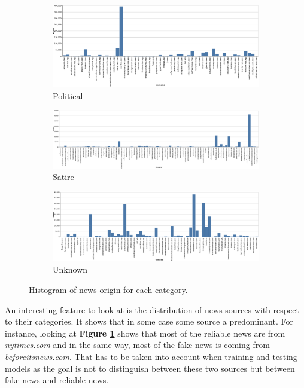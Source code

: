 \begin{figure}\ContinuedFloat
    \begin{subfigure}[b]{1\textwidth}
         \centering
         \includegraphics[width=\textwidth]{images/data_exploration/political.eps}
         \caption{Political}
     \end{subfigure}
     \vfill
     \begin{subfigure}[b]{1\textwidth}
         \centering
         \includegraphics[width=\textwidth]{images/data_exploration/satire.eps}
         \caption{Satire}
     \end{subfigure}
     \vfill
     \begin{subfigure}[b]{1\textwidth}
         \centering
         \includegraphics[width=\textwidth]{images/data_exploration/unknown.eps}
         \caption{Unknown}
     \end{subfigure}
        \caption{Histogram of news origin for each category.}
        \label{fig:data_explo:source}
\end{figure}
 An interesting feature to look at is the distribution of news sources with respect to their categories. It shows that in some case some source a predominant. For instance, looking at \textbf{Figure \ref{fig:data_explo:source}} shows that most of the reliable news are from \textit{nytimes.com} and in the same way, most of the fake news is coming from \textit{beforeitsnews.com}. That has to be taken into account when training and testing models as the goal is not to distinguish between these two sources but between fake news and reliable news. \\

